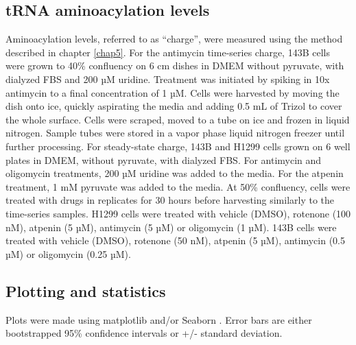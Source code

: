 \subsection{tRNA aminoacylation levels}
Aminoacylation levels, referred to as ``charge'', were measured using the method described in chapter \ref{chap5}.
For the antimycin time-series charge, 143B cells were grown to 40\% confluency on 6 cm dishes in DMEM without pyruvate, with dialyzed FBS and 200 µM uridine.
Treatment was initiated by spiking in 10x antimycin to a final concentration of 1 µM.
Cells were harvested by moving the dish onto ice, quickly aspirating the media and adding 0.5 mL of Trizol to cover the whole surface.
Cells were scraped, moved to a tube on ice and frozen in liquid nitrogen.
Sample tubes were stored in a vapor phase liquid nitrogen freezer until further processing.
For steady-state charge, 143B and H1299 cells grown on 6 well plates in DMEM, without pyruvate, with dialyzed FBS.
For antimycin and oligomycin treatments, 200 µM uridine was added to the media.
For the atpenin treatment, 1 mM pyruvate was added to the media.
At 50\% confluency, cells were treated with drugs in replicates for 30 hours before harvesting similarly to the time-series samples.
H1299 cells were treated with vehicle (DMSO), rotenone (100 nM), atpenin (5 µM), antimycin (5 µM) or oligomycin (1 µM).
143B cells were treated with vehicle (DMSO), rotenone (50 nM), atpenin (5 µM), antimycin (0.5 µM) or oligomycin (0.25 µM).


\subsection{Plotting and statistics}
Plots were made using matplotlib and/or Seaborn \cite{Waskom2021-ar}.
Error bars are either bootstrapped 95\% confidence intervals or +/- standard deviation.

